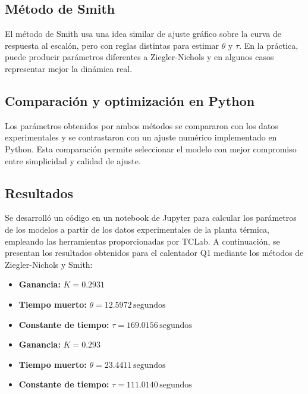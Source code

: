 \documentclass[letterpaper,12pt]{article}
\begin{document}
\subsection*{Método de Smith}
El método de Smith usa una idea similar de ajuste gráfico sobre la curva de respuesta al escalón, pero con reglas distintas para estimar \(\theta\) y \(\tau\). En la práctica, puede producir parámetros diferentes a Ziegler-Nichols y en algunos casos representar mejor la dinámica real.

\subsection*{Comparación y optimización en Python}
Los parámetros obtenidos por ambos métodos se compararon con los datos experimentales y se contrastaron con un ajuste numérico implementado en Python. Esta comparación permite seleccionar el modelo con mejor compromiso entre simplicidad y calidad de ajuste.

\subsection*{Resultados}

Se desarrolló un código en un notebook de Jupyter para calcular los parámetros de los modelos a partir de los datos experimentales de la planta térmica, empleando las herramientas proporcionadas por TCLab. A continuación, se presentan los resultados obtenidos para el calentador Q1 mediante los métodos de Ziegler-Nichols y Smith:

\begin{itemize}
        \textbf{Ziegler-Nichols}
            \item \textbf{Ganancia:} \( K = 0.2931 \)
                \item \textbf{Tiempo muerto:} \( \theta = 12.5972 \, \text{segundos} \)
                    \item \textbf{Constante de tiempo:} \( \tau = 169.0156 \, \text{segundos} \)
\end{itemize}

\begin{itemize}
        \textbf{Smith}
            \item \textbf{Ganancia:} \( K = 0.293 \)
                \item \textbf{Tiempo muerto:} \( \theta = 23.4411 \, \text{segundos} \)
                    \item \textbf{Constante de tiempo:} \( \tau = 111.0140 \, \text{segundos} \)
\end{itemize}
\end{document}
